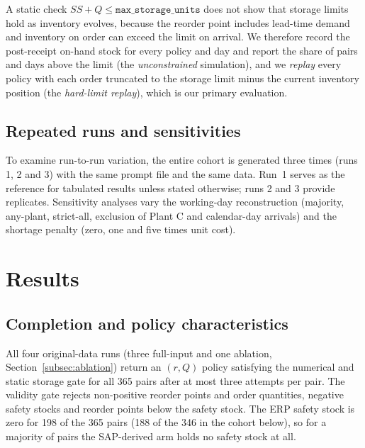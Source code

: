\documentclass[preprint,12pt,nonatbib]{elsarticle}
\begin{document}
A static check $SS+Q\le\texttt{max\_storage\_units}$ does not show that storage limits hold as inventory evolves, because the reorder point includes lead-time demand and inventory on order can exceed the limit on arrival. We therefore record the post-receipt on-hand stock for every policy and day and report the share of pairs and days above the limit (the \emph{unconstrained} simulation), and we \emph{replay} every policy with each order truncated to the storage limit minus the current inventory position (the \emph{hard-limit replay}), which is our primary evaluation.

\subsection{Repeated runs and sensitivities}
To examine run-to-run variation, the entire cohort is generated three times (runs 1, 2 and 3) with the same prompt file and the same data. Run~1 serves as the reference for tabulated results unless stated otherwise; runs 2 and 3 provide replicates. Sensitivity analyses vary the working-day reconstruction (majority, any-plant, strict-all, exclusion of Plant C and calendar-day arrivals) and the shortage penalty (zero, one and five times unit cost).

\section{Results}
\label{sec:results}

\subsection{Completion and policy characteristics}\label{subsec:completion}
All four original-data runs (three full-input and one ablation, Section~\ref{subsec:ablation}) return an $(r,Q)$ policy satisfying the numerical and static storage gate for all 365 pairs after at most three attempts per pair. The validity gate rejects non-positive reorder points and order quantities, negative safety stocks and reorder points below the safety stock. The ERP safety stock is zero for 198 of the 365 pairs (188 of the 346 in the cohort below), so for a majority of pairs the SAP-derived arm holds no safety stock at all.
\end{document}
